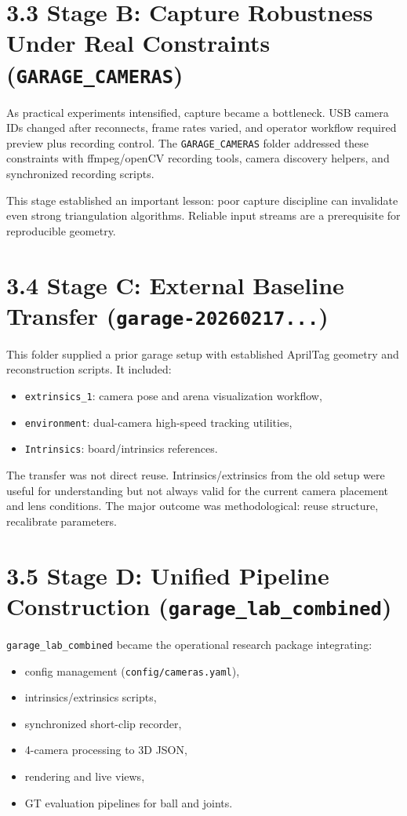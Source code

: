 \section{3.3 Stage B: Capture Robustness Under Real Constraints (\texttt{GARAGE\_CAMERAS})}
As practical experiments intensified, capture became a bottleneck. USB camera IDs changed after reconnects, frame rates varied, and operator workflow required preview plus recording control. The \texttt{GARAGE\_CAMERAS} folder addressed these constraints with ffmpeg/openCV recording tools, camera discovery helpers, and synchronized recording scripts.

This stage established an important lesson: poor capture discipline can invalidate even strong triangulation algorithms. Reliable input streams are a prerequisite for reproducible geometry.

\section{3.4 Stage C: External Baseline Transfer (\texttt{garage-20260217...})}
This folder supplied a prior garage setup with established AprilTag geometry and reconstruction scripts. It included:
\begin{itemize}
  \item \texttt{extrinsics\_1}: camera pose and arena visualization workflow,
  \item \texttt{environment}: dual-camera high-speed tracking utilities,
  \item \texttt{Intrinsics}: board/intrinsics references.
\end{itemize}

The transfer was not direct reuse. Intrinsics/extrinsics from the old setup were useful for understanding but not always valid for the current camera placement and lens conditions. The major outcome was methodological: reuse structure, recalibrate parameters.

\section{3.5 Stage D: Unified Pipeline Construction (\texttt{garage\_lab\_combined})}
\texttt{garage\_lab\_combined} became the operational research package integrating:
\begin{itemize}
  \item config management (\texttt{config/cameras.yaml}),
  \item intrinsics/extrinsics scripts,
  \item synchronized short-clip recorder,
  \item 4-camera processing to 3D JSON,
  \item rendering and live views,
  \item GT evaluation pipelines for ball and joints.
\end{itemize}

